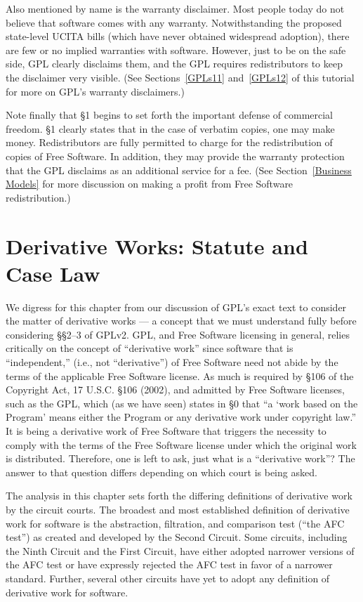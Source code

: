 Also mentioned by name is the warranty disclaimer. Most people today do
not believe that software comes with any warranty. Notwithstanding the
proposed state-level UCITA bills (which have never obtained widespread
adoption), there are few or no implied warranties with software.
However, just to be on the safe side, GPL clearly disclaims them, and the
GPL requires redistributors to keep the disclaimer very visible. (See
Sections~\ref{GPLs11} and~\ref{GPLs12} of this tutorial for more on GPL's
warranty disclaimers.)

Note finally that \S 1 begins to set forth the important defense of
commercial freedom. \S 1 clearly states that in the case of verbatim
copies, one may make money. Redistributors are fully permitted to charge
for the redistribution of copies of Free Software. In addition, they may
provide the warranty protection that the GPL disclaims as an additional
service for a fee. (See Section~\ref{Business Models} for more discussion
on making a profit from Free Software redistribution.)


\chapter{Derivative Works: Statute and Case Law}

We digress for this chapter from our discussion of GPL's exact text to
consider the matter of derivative works --- a concept that we must
understand fully before considering \S\S 2--3 of GPLv2\@. GPL, and Free
Software licensing in general, relies critically on the concept of
``derivative work'' since software that is ``independent,'' (i.e., not
``derivative'') of Free Software need not abide by the terms of the
applicable Free Software license. As much is required by \S 106 of the
Copyright Act, 17 U.S.C. \S 106 (2002), and admitted by Free Software
licenses, such as the GPL, which (as we have seen) states in \S 0 that ``a
`work based on the Program' means either the Program or any derivative
work under copyright law.'' It is being a derivative work of Free Software
that triggers the necessity to comply with the terms of the Free Software
license under which the original work is distributed. Therefore, one is
left to ask, just what is a ``derivative work''? The answer to that
question differs depending on which court is being asked.

The analysis in this chapter sets forth the differing definitions of
derivative work by the circuit courts. The broadest and most
established definition of derivative work for software is the
abstraction, filtration, and comparison test (``the AFC test'') as
created and developed by the Second Circuit. Some circuits, including
the Ninth Circuit and the First Circuit, have either adopted narrower
versions of the AFC test or have expressly rejected the AFC test in
favor of a narrower standard. Further, several other circuits have yet
to adopt any definition of derivative work for software.

